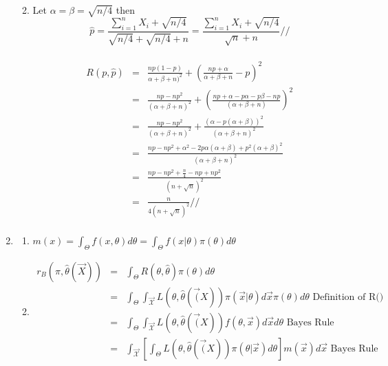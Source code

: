 \documentclass{article}
\begin{document}
\begin{enumerate}
\begin{enumerate}
\begin{eqnarray*}
         \end{eqnarray*}
        \item Let $\alpha = \beta = \sqrt{n/4}$ then $$\hat{p}=\frac{\sum_{i=1}^{n}X_i+\sqrt{n/4}}{\sqrt{n/4} + \sqrt{n/4} + n}=\frac{\sum_{i=1}^{n}X_i+\sqrt{n/4}}{\sqrt{n} + n}//$$\\
          \begin{eqnarray*}
            R(p,\hat{p}) &=& \frac{np(1-p)}{\alpha + \beta + n)^2} + \left(\frac{np + \alpha}{\alpha + \beta + n} -p\right)^2 \\
                         &=& \frac{np-np^2}{(\alpha + \beta + n)^2} + \left(\frac{np + \alpha - p\alpha - p\beta - np}{(\alpha + \beta + n)}\right)^2\\
                         &=& \frac{np-np^2}{(\alpha + \beta + n)^2} + \frac{(\alpha - p(\alpha +\beta))^2}{(\alpha + \beta + n)^2}\\
                         &=& \frac{np - np^2 + \alpha^2 - 2p\alpha(\alpha + \beta) + p^2(\alpha + \beta)^2}{(\alpha + \beta + n)^2} \\
                         &=& \frac{np - np^2 + \frac{n}{4} - np + np^2}{(n + \sqrt{n})^2} \\
                         &=& \frac{n}{4(n+\sqrt{n})^2}// \\
          \end{eqnarray*}
      \end{enumerate}
    \item
      \begin{enumerate}
        \item $m(x) = \int_\Theta f(x,\theta) d\theta = \int_\Theta f(x|\theta)\pi(\theta) d\theta$
        \item \begin{eqnarray*}
                r_B(\pi,\hat{\theta}(\vec{X})) &=& \int_\Theta R(\theta,\hat{\theta})\pi(\theta)d\theta \\
                                               &=& \int_\Theta \int_\vec{\mathcal{X}} L(\theta,\hat{\theta}(\vec(X))\pi(\vec{x}|\theta)d\vec{x}\pi(\theta)d\theta \text{ Definition of R()}\\
                                               &=& \int_\Theta \int_\vec{\mathcal{X}} L(\theta,\hat{\theta}(\vec(X))f(\theta,\vec{x})d\vec{x}d\theta \text{      Bayes Rule}\\
                                               &=& \int_\vec{\mathcal{X}} \left[\int_\Theta L(\theta,\hat{\theta}(\vec(X))\pi(\theta|\vec{x})d\theta\right]m(\vec{x})d\vec{x} \text{    Bayes Rule}\\

\end{eqnarray*}
\end{enumerate}
\end{enumerate}
\end{document}
